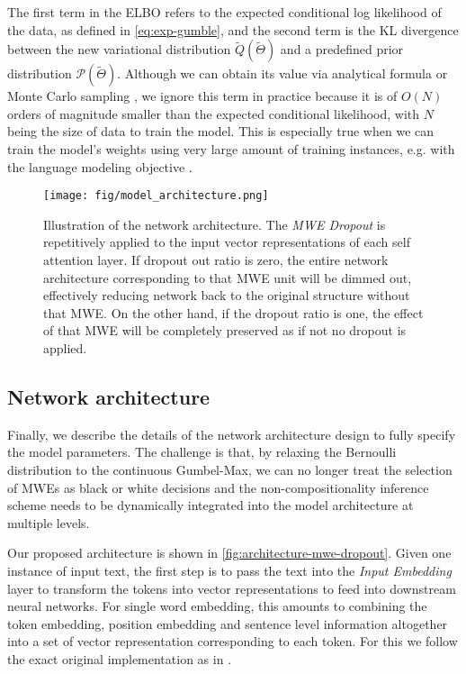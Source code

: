 The first term in the ELBO refers to the expected conditional log likelihood of the data, as defined in \autoref{eq:exp-gumble}, 
and the second term is the KL divergence between the new variational distribution $\tilde{Q} ( \tilde{\Theta})$ 
and a predefined prior distribution  $\mathcal{P}( \tilde{\Theta})$.
Although we can obtain its value via analytical formula or Monte Carlo sampling \cite{gal2016uncertainty}, 
we ignore this term in practice because it is of $O(N)$ orders of magnitude smaller than the expected conditional likelihood, with $N$ being the size of data to train the model. 
This is especially true when we can train the model's weights using very large amount of training instances, e.g. with the language modeling objective \cite{devlin2018bert}.





\begin{figure}[htb]
    \centering
    \texttt{[image: fig/model\_architecture.png]}
    \vspace{20pt}
    \caption{Illustration of the \BertMWE network architecture. 
The \textit{MWE Dropout} is repetitively applied to the input vector representations of each self attention layer. 
If dropout out ratio is zero, the entire network architecture corresponding to that MWE unit will be dimmed out, 
effectively reducing network back to the original structure without that MWE. On the other hand, if the dropout ratio is one, 
 the effect of that MWE will be completely preserved as if not no dropout is applied.
}
    \vspace{10pt}
    \label{fig:architecture-mwe-dropout}
\end{figure}



\subsection{Network architecture}
Finally, we describe the details of the network architecture design to fully specify the model parameters. 
The challenge is that, by relaxing the Bernoulli distribution to the continuous Gumbel-Max, we can no longer treat the selection of MWEs as black or white decisions
and the non-compositionality inference scheme needs to 
be dynamically integrated into the model architecture at multiple levels. 

Our proposed architecture is shown in \autoref{fig:architecture-mwe-dropout}. 
Given one instance of input text, the first step is to pass the text into the \textit{Input Embedding} layer to transform the tokens into vector representations to feed into downstream neural networks.
For single word embedding, this amounts to combining the token embedding, position embedding and sentence level information altogether into a set of vector representation
corresponding to each token. For this we follow the exact original implementation as in \cite{devlin2018bert}.

